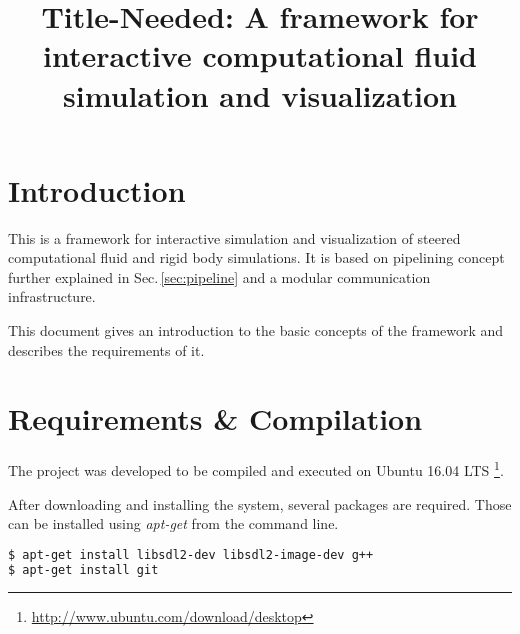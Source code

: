 \documentclass[11pt,a4paper]{article}
\begin{document}

\title{Title-Needed: A framework for interactive computational fluid simulation and
visualization}

\maketitle



\section{Introduction}

This is a framework for interactive simulation and visualization of
steered computational fluid and rigid body simulations.
It is based on pipelining concept further explained in Sec.\,\ref{sec:pipeline}
and a modular communication infrastructure.

This document gives an introduction to the basic concepts of the framework and
describes the requirements of it.



\section{Requirements \& Compilation}

The project was developed to be compiled and executed on Ubuntu 16.04 LTS
\footnote{\url{http://www.ubuntu.com/download/desktop}}.

After downloading and installing the system, several packages are required.
Those can be installed using \textit{apt-get} from the command line.

\begin{lstlisting}[language=sh]
$ apt-get install libsdl2-dev libsdl2-image-dev g++
$ apt-get install git
\end{lstlisting}
\end{document}
